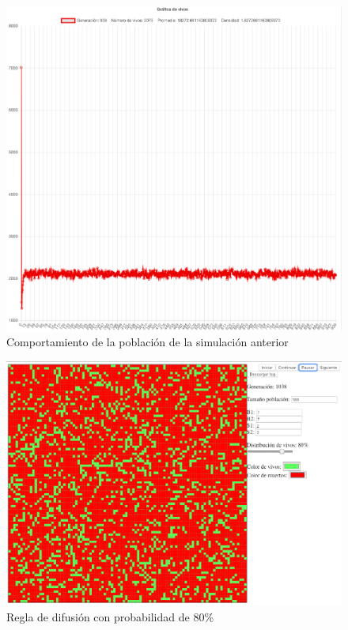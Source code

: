 	\begin{figure}[H]
		\begin{center}
			\includegraphics[scale=.24]{GOL/img/dif70-2.png}
			\caption{Comportamiento de la población de la simulación anterior}
			\label{fig:gol5}
		\end{center}
	\end{figure}

	\begin{figure}[H]
		\begin{center}
			\includegraphics[scale=.3]{GOL/img/dif80-1.png}
			\caption{Regla de difusión con probabilidad de 80\%}
			\label{fig:gol5}
		\end{center}
	\end{figure}

